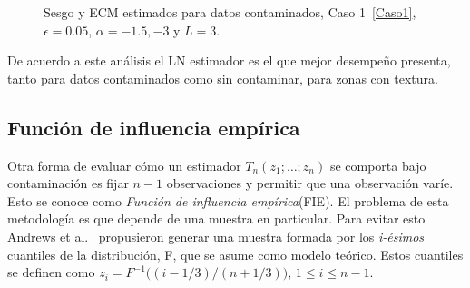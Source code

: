 \begin{figure}[htb]
	\caption{\label{SesgoyECMConContL=3-1punto5y-3}\small Sesgo y ECM estimados para datos contaminados, Caso 1~\ref{Caso1}, $\epsilon=0.05$, $\alpha=-1.5, -3$ y $ L=3$.}
\end{figure}

De acuerdo a este análisis el LN estimador es el que mejor desempeño presenta, tanto para datos contaminados como sin contaminar, para zonas con textura.

\subsection{Función de influencia empírica}
\label{FIES}

Otra forma de evaluar cómo un estimador $T_n(z_1; \ldots ; z_n)$ se comporta bajo contaminación es fijar $n-1$ observaciones y permitir que una observación varíe. Esto se conoce como \textit{Función de influencia empírica}(FIE). El problema de esta metodología es que depende de una muestra en particular. Para evitar esto Andrews et al.~\cite{Andrews1972} propusieron generar una muestra formada por los \textit{i-ésimos} cuantiles de la distribución, F, que se asume como modelo teórico. Estos cuantiles se definen como $z_i=F^{-1}\big((i-1/3)/(n+1/3) \big)$, $1\leq i\leq n-1$.

